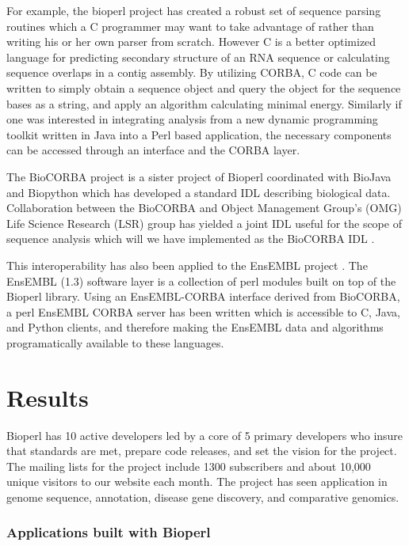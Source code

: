 \documentclass[12pt]{article}
\begin{document}
For example, the bioperl project has created a robust set of sequence
parsing routines which a C programmer may want to take advantage of
rather than writing his or her own parser from scratch.  However C is a
better optimized language for predicting secondary structure of an RNA
sequence or calculating sequence overlaps in a contig assembly.  By
utilizing CORBA, C code can be written to simply obtain a sequence
object and query the object for the sequence bases as a string, and
apply an algorithm calculating minimal energy.  Similarly if one was
interested in integrating analysis from a new dynamic programming
toolkit written in Java into a Perl based application, the necessary
components can be accessed through an interface and the CORBA layer.

The BioCORBA project is a sister project of Bioperl coordinated with
BioJava \cite{biojava} and Biopython \cite{biopython} which has
developed a standard IDL describing biological data.  Collaboration
between the BioCORBA and Object Management Group's (OMG) Life Science
Research (LSR) group has yielded a joint IDL useful for the scope of
sequence analysis which will we have implemented as the BioCORBA IDL
\cite{biocorba}.

This interoperability has also been applied to the EnsEMBL project
\cite{ensembl-nar}.  The EnsEMBL (1.3) software layer is a
collection of perl modules built on top of the Bioperl library.
Using an EnsEMBL-CORBA interface derived from BioCORBA, a perl EnsEMBL
CORBA server has been written which is accessible to C, Java, and
Python clients, and therefore making the EnsEMBL data and algorithms
programatically available to these languages.

\section{Results}

Bioperl has 10 active developers led by a core of 5 primary developers
who insure that standards are met, prepare code releases, and set
the vision for the project.  The mailing lists for the project include
1300 subscribers and about 10,000 unique visitors to our website each month.
The project has seen application in genome sequence, annotation,
disease gene discovery, and comparative genomics.

\subsubsection{Applications built with Bioperl}
\end{document}

